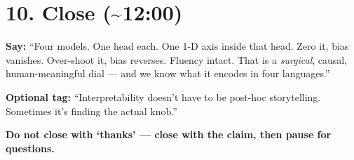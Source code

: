 \documentclass[11pt]{article}
\begin{document}
\section*{10. Close (\textasciitilde 12:00)}
\begin{tcolorbox}[beat]
\textbf{Say:} ``Four models. One head each. One 1-D axis inside that head.
Zero it, bias vanishes. Over-shoot it, bias reverses. Fluency intact. That
is a \emph{surgical}, causal, human-meaningful dial --- and we know what it
encodes in four languages.''

\textbf{Optional tag:} ``Interpretability doesn't have to be
post-hoc storytelling. Sometimes it's finding the actual knob.''

\textbf{Do not close with `thanks' --- close with the claim, then pause for
questions.}
\end{tcolorbox}

\end{document}
